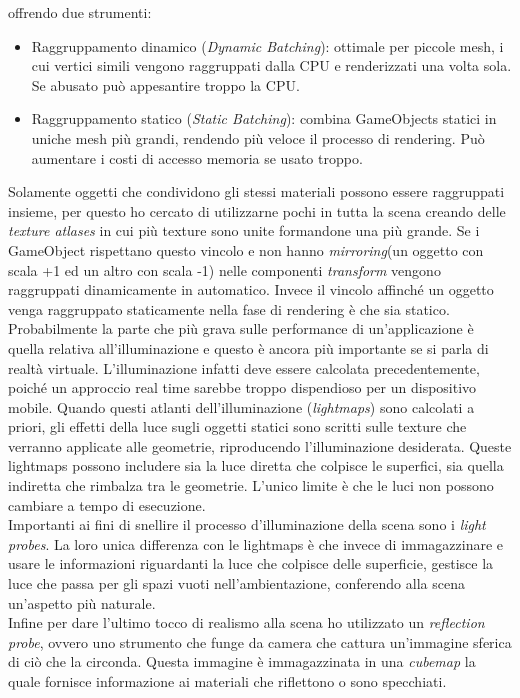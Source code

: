 offrendo due strumenti:
\begin{itemize}
	\item Raggruppamento dinamico (\textit{Dynamic Batching}): ottimale per piccole mesh, i cui vertici simili vengono raggruppati dalla CPU e renderizzati una volta sola. Se abusato può appesantire troppo la CPU.
	\item Raggruppamento statico (\textit{Static Batching}): combina GameObjects statici in uniche mesh più grandi, rendendo più veloce il processo di rendering. Può aumentare i costi di accesso memoria se usato troppo.
\end{itemize} 
Solamente oggetti che condividono gli stessi materiali possono essere raggruppati insieme, per questo ho cercato di utilizzarne pochi in tutta la scena creando delle \textit{texture atlases} in cui più texture sono unite formandone una più grande. Se i GameObject rispettano questo vincolo e non hanno \textit{mirroring}(un oggetto con scala +1 ed un altro con scala -1) nelle componenti \textit{transform} vengono raggruppati dinamicamente in automatico. Invece il vincolo affinché un oggetto venga raggruppato staticamente nella fase di rendering è che sia statico. \\

Probabilmente la parte che più grava sulle performance di un'applicazione è quella relativa all'illuminazione e questo è ancora più importante se si parla di realtà virtuale. L'illuminazione infatti deve essere calcolata precedentemente, poiché un approccio real time sarebbe troppo dispendioso per un dispositivo mobile. Quando questi atlanti dell'illuminazione (\textit{lightmaps}) sono calcolati a priori, gli effetti della luce sugli oggetti statici sono scritti sulle texture che verranno applicate alle geometrie, riproducendo l'illuminazione desiderata. Queste lightmaps possono includere sia la luce diretta che colpisce le superfici, sia quella indiretta che rimbalza tra le geometrie. L'unico limite è che le luci non possono cambiare a tempo di esecuzione. \\
Importanti ai fini di snellire il processo d'illuminazione della scena sono i \textit{light probes}. La loro unica differenza con le lightmaps è che invece di immagazzinare e usare le informazioni riguardanti la luce che colpisce delle superficie, gestisce la luce che passa per gli spazi vuoti nell'ambientazione, conferendo alla scena un'aspetto più naturale. \\
Infine per dare l'ultimo tocco di realismo alla scena ho utilizzato un \textit{reflection probe}, ovvero uno strumento che funge da camera che cattura un'immagine sferica di ciò che la circonda. Questa immagine è immagazzinata in una \textit{cubemap} la quale fornisce informazione ai materiali che riflettono o sono specchiati.\\

